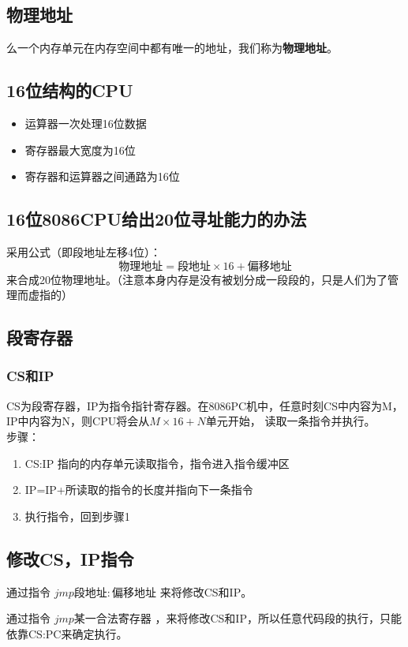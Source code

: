 \documentclass[11pt,a4paper]{ctexart}
\begin{document}
\subsection{物理地址}
么一个内存单元在内存空间中都有唯一的地址，我们称为\textbf{物理地址}。

\subsection{16位结构的CPU}
\begin{itemize}
	\item 运算器一次处理16位数据
	\item 寄存器最大宽度为16位
	\item 寄存器和运算器之间通路为16位
\end{itemize}
\subsection{16位8086CPU给出20位寻址能力的办法}
采用公式（即段地址左移4位）：
\begin{equation}
	\text{物理地址}=\text{段地址}\times 16 +\text{偏移地址}
\end{equation}
来合成20位物理地址。（注意本身内存是没有被划分成一段段的，只是人们为了管理而虚指的）
\subsection{段寄存器}
\subsubsection{CS和IP}
CS为段寄存器，IP为指令指针寄存器。在8086PC机中，任意时刻CS中内容为M，IP中内容为N，则CPU将会从$M\times 16+N$单元开始，
读取一条指令并执行。
~\\
步骤：
\begin{enumerate}
	\item \colorbox{mygrey}{\color{myblue}CS:IP} 指向的内存单元读取指令，指令进入指令缓冲区
	\item IP=IP+所读取的指令的长度并指向下一条指令
	\item 执行指令，回到步骤1
\end{enumerate}

\subsection{修改CS，IP指令}
通过指令 $jmp \text{段地址}:\text{偏移地址}$  来将修改CS和IP。
\par
通过指令 $jmp 某一合法寄存器$  ，来将修改CS和IP，所以任意代码段的执行，只能依靠CS:PC来确定执行。
\end{document}
